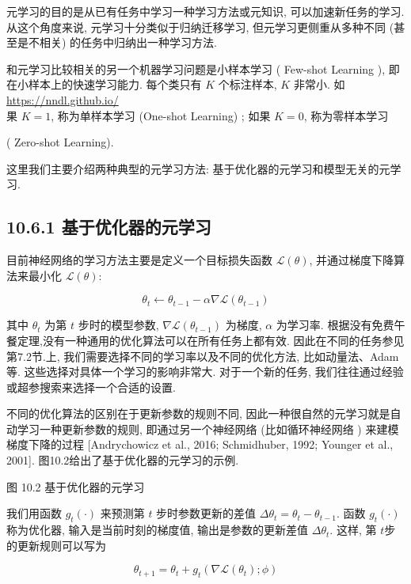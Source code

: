 \documentclass[10pt]{article}
\begin{document}
元学习的目的是从已有任务中学习一种学习方法或元知识, 可以加速新任务的学习. 从这个角度来说, 元学习十分类似于归纳迁移学习, 但元学习更侧重从多种不同 (甚至是不相关) 的任务中归纳出一种学习方法.

和元学习比较相关的另一个机器学习问题是小样本学习 ( Few-shot Learning ), 即在小样本上的快速学习能力. 每个类只有 $K$ 个标注样本, $K$ 非常小. 如 \href{https://nndl.github.io/}{https://nndl.github.io/}\\
果 $K=1$, 称为单样本学习 (One-shot Learning) ; 如果 $K=0$, 称为零样本学习

( Zero-shot Learning).

这里我们主要介绍两种典型的元学习方法: 基于优化器的元学习和模型无关的元学习.

\subsection*{10.6.1 基于优化器的元学习}
目前神经网络的学习方法主要是定义一个目标损失函数 $\mathcal{L}(\theta)$, 并通过梯度下降算法来最小化 $\mathcal{L}(\theta):$


\begin{equation*}
\theta_{t} \leftarrow \theta_{t-1}-\alpha \nabla \mathcal{L}\left(\theta_{t-1}\right) \tag{10.51}
\end{equation*}


其中 $\theta_{t}$ 为第 $t$ 步时的模型参数, $\nabla \mathcal{L}\left(\theta_{t-1}\right)$ 为梯度, $\alpha$ 为学习率. 根据没有免费午餐定理,没有一种通用的优化算法可以在所有任务上都有效. 因此在不同的任务参见第7.2节.上, 我们需要选择不同的学习率以及不同的优化方法, 比如动量法、Adam 等. 这些选择对具体一个学习的影响非常大. 对于一个新的任务, 我们往往通过经验或超参搜索来选择一个合适的设置.

不同的优化算法的区别在于更新参数的规则不同, 因此一种很自然的元学习就是自动学习一种更新参数的规则, 即通过另一个神经网络 (比如循环神经网络 ) 来建模梯度下降的过程 [Andrychowicz et al., 2016; Schmidhuber, 1992; Younger et al., 2001]. 图10.2给出了基于优化器的元学习的示例.



图 10.2 基于优化器的元学习

我们用函数 $g_{t}(\cdot)$ 来预测第 $t$ 步时参数更新的差值 $\Delta \theta_{t}=\theta_{t}-\theta_{t-1}$. 函数 $g_{t}(\cdot)$称为优化器, 输入是当前时刻的梯度值, 输出是参数的更新差值 $\Delta \theta_{t}$. 这样, 第 $t$步的更新规则可以写为


\begin{equation*}
\theta_{t+1}=\theta_{t}+g_{t}\left(\nabla \mathcal{L}\left(\theta_{t}\right) ; \phi\right) \tag{10.52}
\end{equation*}
\end{document}
